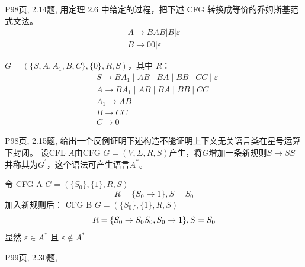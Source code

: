 \documentclass[11pt,addpoints,answers]{exam}
\begin{document}
\begin{questions}
    
    \question P98页, 2.14题, 
	用定理 2.6 中给定的过程，把下述 CFG 转换成等价的乔姆斯基范式文法。
    \begin{equation*}
    \begin{array}{l}A \rightarrow B A B|B| \varepsilon \\\left.B \rightarrow 00\right|{\varepsilon}\end{array}
    \end{equation*}
	\begin{solution}
 \( G = (\{S, A, A_1, B, C\}, \{0\}, R, S) \)，其中 \( R \)：
\[
\begin{aligned}
&S \rightarrow BA_1 \mid AB \mid BA \mid BB \mid CC \mid \varepsilon \\
&A \rightarrow BA_1 \mid AB \mid BA \mid BB \mid CC \\
&A_1 \rightarrow AB \\
&B \rightarrow CC \\
&C \rightarrow 0
\end{aligned}
\]
	\end{solution} 




\question P98页, 2.15题, 
	给出一个反例证明下述构造不能证明上下文无关语言类在星号运算下封闭。 设CFL $A$由CFG $G=(V,\Sigma ,R,S)$产生，将$G$增加一条新规则$S\to SS$并称其为$G^{\prime}$，这个语法可产生语言$A^{*}$。

	\begin{solution}
令 CFG A \( G = (\{S_0\}, \{1\}, R, S) \)
\[
R=\{S_0 \rightarrow 1\},
S=S_0
\]
加入新规则后：
CFG B \( G = (\{S_0\}, \{1\}, R, S) \)
\[
R=\{S_0\rightarrow S_0S_0, \space S_0 \rightarrow 1\},
S=S_0
\]
显然 $\varepsilon \in A^{*}$ 且 $\varepsilon \notin A^{*}$


	\end{solution} 




    \question P99页, 2.30题, 
\end{questions}
\end{document}

